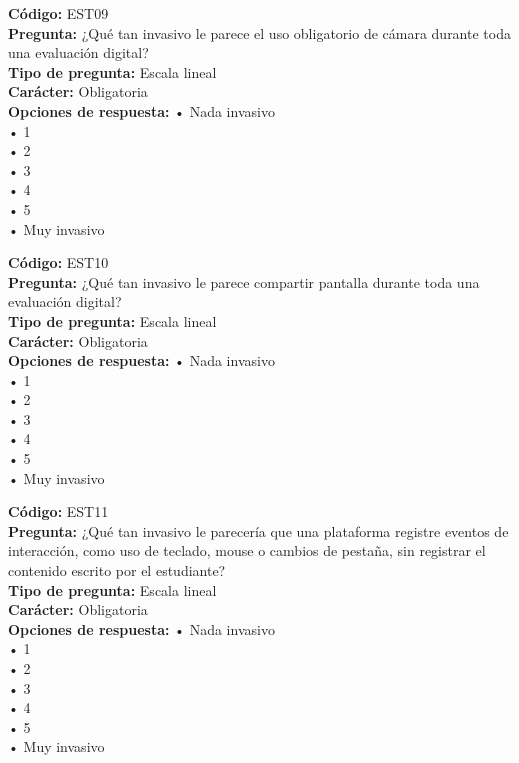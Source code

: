 \begin{infobox}\small
\textbf{\textcolor{accent}{Código:}} EST09\\
\textbf{\textcolor{accent}{Pregunta:}} ¿Qué tan invasivo le parece el uso obligatorio de cámara durante toda una evaluación digital?\\
\textbf{\textcolor{accent}{Tipo de pregunta:}} Escala lineal\\
\textbf{\textcolor{accent}{Carácter:}} Obligatoria\\
\textbf{\textcolor{accent}{Opciones de respuesta:}} • Nada invasivo \\ • 1 \\ • 2 \\ • 3 \\ • 4 \\ • 5 \\ • Muy invasivo\\
\end{infobox}
\begin{infobox}\small
\textbf{\textcolor{accent}{Código:}} EST10\\
\textbf{\textcolor{accent}{Pregunta:}} ¿Qué tan invasivo le parece compartir pantalla durante toda una evaluación digital?\\
\textbf{\textcolor{accent}{Tipo de pregunta:}} Escala lineal\\
\textbf{\textcolor{accent}{Carácter:}} Obligatoria\\
\textbf{\textcolor{accent}{Opciones de respuesta:}} • Nada invasivo \\ • 1 \\ • 2 \\ • 3 \\ • 4 \\ • 5 \\ • Muy invasivo\\
\end{infobox}
\begin{infobox}\small
\textbf{\textcolor{accent}{Código:}} EST11\\
\textbf{\textcolor{accent}{Pregunta:}} ¿Qué tan invasivo le parecería que una plataforma registre eventos de interacción, como uso de teclado, mouse o cambios de pestaña, sin registrar el contenido escrito por el estudiante?\\
\textbf{\textcolor{accent}{Tipo de pregunta:}} Escala lineal\\
\textbf{\textcolor{accent}{Carácter:}} Obligatoria\\
\textbf{\textcolor{accent}{Opciones de respuesta:}} • Nada invasivo \\ • 1 \\ • 2 \\ • 3 \\ • 4 \\ • 5 \\ • Muy invasivo\\
\end{infobox}
